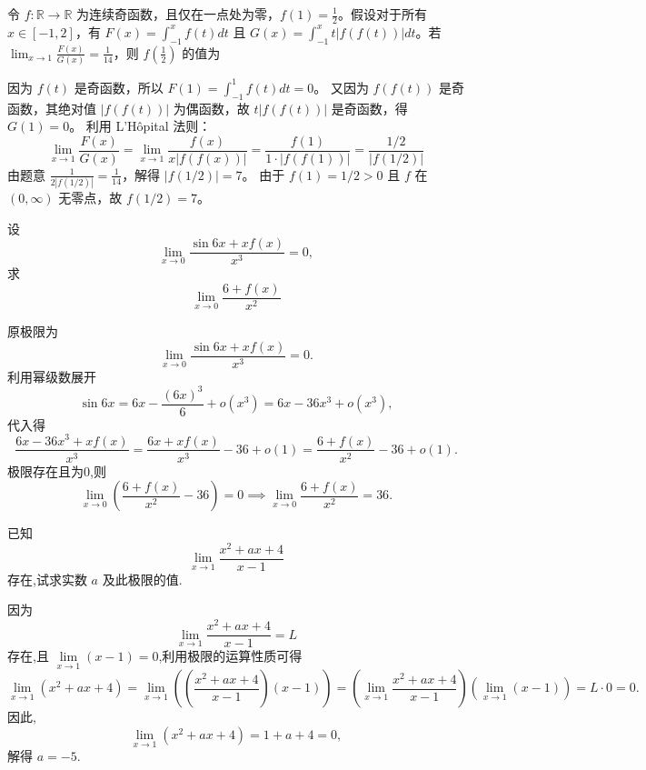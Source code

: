 \begin{questions}
\begin{parts}
\end{parts}

    \question 令 $f : \mathbb{R} \to \mathbb{R}$ 为连续奇函数，且仅在一点处为零，$f(1) = \frac{1}{2}$。假设对于所有 $x \in [-1, 2]$，有 $F(x) = \int_{-1}^{x} f(t) dt$ 且 $G(x) = \int_{-1}^{x} t|f(f(t))| dt$。若 $\lim_{x \to 1} \frac{F(x)}{G(x)} = \frac{1}{14}$，则 $f\left(\frac{1}{2}\right)$ 的值为

\begin{solution}
因为 $f(t)$ 是奇函数，所以 $F(1) = \int_{-1}^1 f(t) dt = 0$。
又因为 $f(f(t))$ 是奇函数，其绝对值 $|f(f(t))|$ 为偶函数，故 $t|f(f(t))|$ 是奇函数，得 $G(1) = 0$。
利用 L'Hôpital 法则：
\[
\lim_{x \to 1} \frac{F(x)}{G(x)} = \lim_{x \to 1} \frac{f(x)}{x|f(f(x))|} = \frac{f(1)}{1 \cdot |f(f(1))|} = \frac{1/2}{|f(1/2)|}
\]
由题意 $\frac{1}{2|f(1/2)|} = \frac{1}{14}$，解得 $|f(1/2)| = 7$。
由于 $f(1) = 1/2 > 0$ 且 $f$ 在 $(0, \infty)$ 无零点，故 $f(1/2) = 7$。
\end{solution}

    \question 设
    \[
    \lim_{x \to 0} \frac{\sin 6x + x f(x)}{x^3} = 0,
    \]
    求
    \[
    \lim_{x \to 0} \frac{6 + f(x)}{x^2}
    \]
    \begin{solution}
        原极限为
        \[
        \lim_{x \to 0} \frac{\sin 6x + x f(x)}{x^3} = 0.
        \]
        利用幂级数展开
        \[
        \sin 6x = 6x - \frac{(6x)^3}{6} + o(x^3) = 6x - 36 x^3 + o(x^3),
        \]
        代入得
        \[
        \frac{6x - 36 x^3 + x f(x)}{x^3} = \frac{6x + x f(x)}{x^3} - 36 + o(1) = \frac{6 + f(x)}{x^2} - 36 + o(1).
        \]
        极限存在且为0,则
        \[
        \lim_{x \to 0} \left(\frac{6 + f(x)}{x^2} - 36\right) = 0 \implies \lim_{x \to 0} \frac{6 + f(x)}{x^2} = 36.
        \]
    \end{solution}

    \question 已知 \[
\lim_{x\to 1}\frac{x^2+ax+4}{x-1}
\]
存在,试求实数 $a$ 及此极限的值.

\begin{solution}
因为 \[
\lim_{x\to 1}\frac{x^2+ax+4}{x-1}=L
\]
存在,且 $\lim\limits_{x\to 1}(x-1)=0$,利用极限的运算性质可得
\[
\lim_{x\to 1}(x^2+ax+4) = \lim_{x\to 1}\left(\left(\frac{x^2+ax+4}{x-1}\right)(x-1)\right) = \left(\lim_{x\to 1}\frac{x^2+ax+4}{x-1}\right)\left(\lim_{x\to 1}(x-1)\right) = L\cdot 0=0.
\]
因此,
\[
\lim_{x\to 1}(x^2+ax+4) = 1+a+4=0,
\]
解得 $a=-5$.


\end{solution}
\end{questions}
